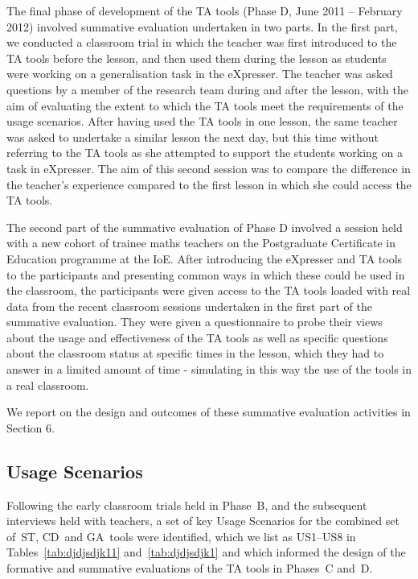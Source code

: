 The final phase of development of the TA tools (Phase D, June 2011 –
February 2012) involved summative evaluation undertaken in two
parts. In the first part, we conducted a classroom trial in which the
teacher was first introduced to the TA tools before the lesson, and
then used them during the lesson as students were working on a
generalisation task in the eXpresser. The teacher was asked questions
by a member of the research team during and after the lesson, with the
aim of evaluating the extent to which the TA tools meet the
requirements of the usage scenarios. After having used the TA tools in
one lesson, the same teacher was asked to undertake a similar lesson
the next day, but this time without referring to the TA tools as she
attempted to support the students working on a task in eXpresser. The
aim of this second session was to compare the difference in the
teacher's experience compared to the first lesson in which she could
access the TA tools.
 
The second part of the summative evaluation of Phase D involved a
session held with a new cohort of trainee maths teachers on the
Postgraduate Certificate in Education programme at the IoE. After
introducing the eXpresser and TA tools to the participants and
presenting common ways in which these could be used in the classroom,
the participants were given access to the TA tools loaded with real
data from the recent classroom sessions undertaken in the first part
of the summative evaluation. They were given a questionnaire to probe
their views about the usage and effectiveness of the TA tools as well
as specific questions about the classroom status at specific times in
the lesson, which they had to answer in a limited amount of time -
simulating in this way the use of the tools in a real classroom.
 
We report on the design and outcomes of these summative evaluation
activities in Section 6.

\subsection*{Usage Scenarios}
\label{sec:usage-scenarios}

Following the early classroom trials held in Phase~B, and the
subsequent interviews held with teachers, a set of key Usage Scenarios
for the combined set of~ST, CD~and GA~tools were identified, which we
list as US1--US8 in Tables~\ref{tab:djdjsdjk11}
and~\ref{tab:djdjsdjk1} 
and which informed the design of the formative
and summative evaluations of the TA tools in Phases~C and~D.

